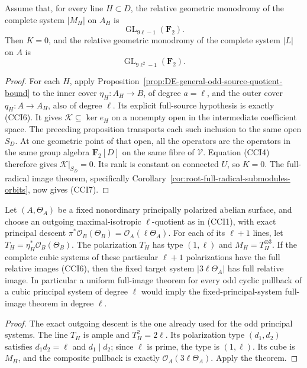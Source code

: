 \begin{theorem}
\label{thm:compatible-cyclic-intermediate-criterion}
Assume that, for every line \(H\subset D\), the relative
geometric monodromy of the complete system \(|M_H|\) on \(A_H\)
is
\[
                 \operatorname{GL}_{9\ell-1}(\mathbf F_2).
 \tag{CCI6}
\]
Then \(K=0\), and the relative geometric monodromy of the
complete system \(|L|\) on \(A\) is
\[
                 \operatorname{GL}_{9\ell^2-1}(\mathbf F_2).
 \tag{CCI7}
\]
\end{theorem}
\begin{proof}
For each \(H\), apply
Proposition~\ref{prop:DE-general-odd-source-quotient-bound}
to the inner cover \(\eta_H:A_H\to B\), of degree
\(a=\ell\), and the outer cover \(q_H:A\to A_H\), also
of degree \(\ell\). Its explicit full-source hypothesis is
exactly (CCI6). It gives \(\mathcal K\subseteq\ker e_H\)
on a nonempty open in the intermediate coefficient space.
The preceding proposition transports each such inclusion to the
same open \(S_D\). At one geometric point of that open, all
the operators are the operators in the same group algebra
\(\mathbf F_2[D]\) on the same fibre of \(\mathcal V\).
Equation (CCI4) therefore gives \(\mathcal K|_{S_D}=0\).
Its rank is constant on connected \(U\), so \(K=0\).
The full-radical image theorem, specifically
Corollary~\ref{cor:root-full-radical-submodules-orbits}, now
gives (CCI7).
\end{proof}

\begin{corollary}
\label{cor:compatible-cyclic-principal-prime-criterion}
Let \((A,\Theta_A)\) be a fixed nonordinary principally polarized
abelian surface, and choose an outgoing maximal-isotropic
\(\ell\)-quotient as in (CCI1), with exact principal descent
\(\pi^*\mathcal O_B(\Theta_B)=\mathcal O_A(\ell\Theta_A)\).
For each of its \(\ell+1\) lines, let
\(T_H=\eta_H^*\mathcal O_B(\Theta_B)\).
The polarization \(T_H\) has type \((1,\ell)\) and
\(M_H=T_H^{\otimes3}\). If the complete cubic systems of
these particular \(\ell+1\) polarizations have the full
relative images (CCI6), then the fixed target system
\(|3\ell\Theta_A|\) has full relative image.
In particular a uniform full-image theorem for every odd cyclic
pullback of a cubic principal system of degree \(\ell\) would
imply the fixed-principal-system full-image theorem in degree
\(\ell\).
\end{corollary}
\begin{proof}
The exact outgoing descent is the one already used for the odd
principal systems. The line \(T_H\) is ample and
\(T_H^2=2\ell\). Its polarization type \((d_1,d_2)\)
satisfies \(d_1d_2=\ell\) and \(d_1\mid d_2\); since
\(\ell\) is prime, the type is \((1,\ell)\). Its cube is
\(M_H\), and the composite pullback is exactly
\(\mathcal O_A(3\ell\Theta_A)\). Apply the theorem.
\end{proof}

